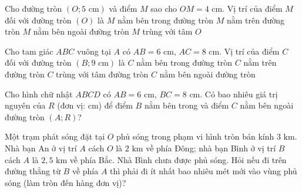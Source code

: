 

\begin{ex}%
	Cho đường tròn $(O;5\text{ cm})$ và điểm $M$ sao cho $OM=4\text{ cm}$. Vị trí của điểm $M$ đối với đường tròn $(O)$ là
	\choice
	{\True $M$ nằm bên trong đường tròn}
	{$M$ nằm trên đường tròn}
	{$M$ nằm bên ngoài đường tròn}
	{$M$ trùng với tâm $O$}
\end{ex}

\begin{ex}%
	Cho tam giác $ABC$ vuông tại $A$ có $AB=6\text{ cm}$, $AC=8\text{ cm}$. Vị trí của điểm $C$ đối với đường tròn $(B;9\text{ cm})$ là
	\choice
	{$C$ nằm bên trong đường tròn}
	{$C$ nằm trên đường tròn}
	{$C$ trùng với tâm đường tròn}
	{\True $C$ nằm bên ngoài đường tròn}
\end{ex}

\begin{bt}%
	Cho hình chữ nhật $ABCD$ có $AB=6\text{ cm}$, $BC=8\text{ cm}$. Có bao nhiêu giá trị nguyên của $R$ (đơn vị: cm) để điểm $B$ nằm bên trong và điểm $C$ nằm bên ngoài đường tròn $(A;R)$?
\end{bt}

\begin{bt}%
	Một trạm phát sóng đặt tại $O$ phủ sóng trong phạm vi hình tròn bán kính $3\text{ km}$. Nhà bạn An ở vị trí $A$ cách $O$ là $2\text{ km}$ về phía Đông; nhà bạn Bình ở vị trí $B$ cách $A$ là $2{,}5\text{ km}$ về phía Bắc. Nhà Bình chưa được phủ sóng. Hỏi nếu đi trên đường thẳng từ $B$ về phía $A$ thì phải đi ít nhất bao nhiêu mét mới vào vùng phủ sóng (làm tròn đến hàng đơn vị)?
\end{bt}

